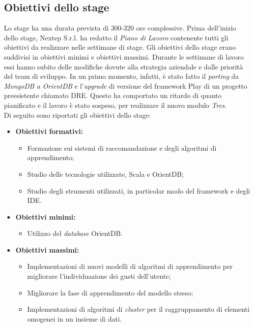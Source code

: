 \subsection{Obiettivi dello stage}
Lo stage ha una durata prevista di 300-320 ore complessive. Prima dell'inizio dello stage, Nextep S.r.l. ha redatto il \textit{Piano di Lavoro }contenente tutti gli obiettivi da realizzare nelle settimane di stage.
Gli obiettivi dello stage erano suddivisi in obiettivi minimi e obiettivi massimi. Durante le settimane  di lavoro essi hanno subito delle modifiche dovute alla strategia aziendale e dalle priorità del team di sviluppo. In un primo momento, infatti, è stato fatto il \textit{porting }da \textit{MongoDB a OrientDB }e l'\textit{upgrade }di versione del \gls{framework} Play di un progetto preesistente chiamato DRE. Questo ha comportato un ritardo di quanto pianificato e il lavoro è stato sospeso, per realizzare il nuovo modulo \textit{Tres}.\\
Di seguito sono riportati gli obiettivi dello stage:
\begin{itemize}
	\item \textbf{Obiettivi formativi:}
	\begin{itemize}
		\item Formazione sui sistemi di raccomandazione e degli algoritmi di apprendimento;
		\item Studio delle tecnologie utilizzate, Scala e OrientDB;
		\item Studio degli strumenti utilizzati, in particolar modo del \gls{framework} e degli \gls{IDE}.
	\end{itemize}
	\item \textbf{Obiettivi minimi:}
	\begin{itemize}
		\item Utilizzo del \textit{database} OrientDB.
	\end{itemize}
	\item \textbf{Obiettivi massimi:}
	\begin{itemize}
		\item Implementazioni di nuovi modelli di algoritmi di apprendimento per migliorare l'individuazione dei gusti dell'utente;
		\item Migliorare la fase di apprendimento del modello stesso;
		\item Implementazioni di algoritmi di \textit{cluster }per il raggruppamento di elementi omogenei in un insieme di dati.
	\end{itemize}
\end{itemize}

